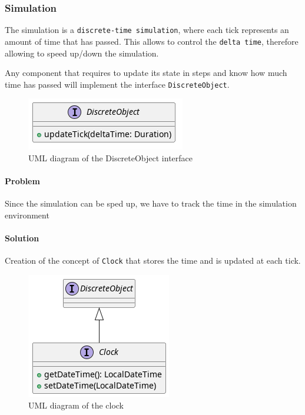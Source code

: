 \subsubsection{Simulation}

The simulation is a \texttt{discrete-time simulation}, where each tick represents an amount of time that has passed.
This allows to control the \texttt{delta time}, therefore allowing to speed up/down the simulation.

Any component that requires to update its state in steps and know how much time
has passed will implement the interface \texttt{DiscreteObject}.

\begin{figure}[H]
\centering{}
\includegraphics[keepaspectratio]{magnani/uml/discreteobject.png}
\caption{UML diagram of the DiscreteObject interface}
\label{magnani:uml:discreteobject}
\end{figure}

\paragraph{Problem} Since the simulation can be sped up, we have to track the time in the simulation environment
\paragraph{Solution} Creation of the concept of \texttt{Clock} that stores the time and is updated at each tick.

\begin{figure}[H]
\centering{}
\includegraphics[keepaspectratio]{magnani/uml/clock.png}
\caption{UML diagram of the clock}
\label{magnani:uml:clock}
\end{figure}

